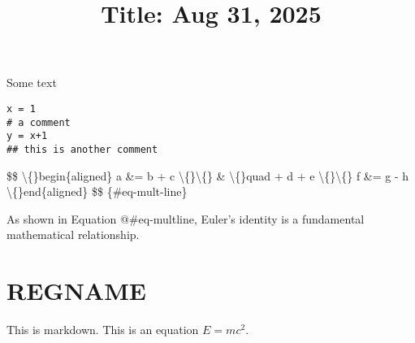 \documentclass{article}
\title{Title: Aug 31, 2025}
\begin{document}
\maketitle


Some text 

\begin{verbatim}
x = 1
# a comment
y = x+1
## this is another comment
\end{verbatim}


\$\$
\textbackslash\{\}begin\{aligned\}
  a \&= b + c \textbackslash\{\}\textbackslash\{\}
  \& \textbackslash\{\}quad + d + e \textbackslash\{\}\textbackslash\{\}
  f \&= g - h
\textbackslash\{\}end\{aligned\}
\$\$ \{\#eq-mult-line\} 

As shown in Equation @\#eq-multline, Euler's identity is a fundamental mathematical relationship.
\section{REGNAME}
This is markdown. This is an equation $E=mc^2$.
\end{document}
